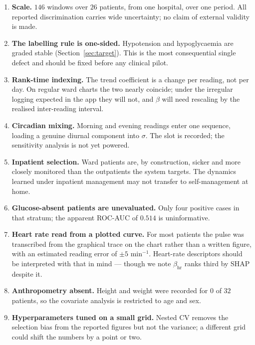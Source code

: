 \documentclass[11pt,a4paper]{article}
\newcommand{\hr}{\mathrm{hr}}
\begin{document}
\begin{enumerate}
\item \textbf{Scale.} $146$ windows over $26$ patients, from one hospital, over one
period. All reported discrimination carries wide uncertainty; no claim of external
validity is made.

\item \textbf{The labelling rule is one-sided.} Hypotension and hypoglycaemia are
graded \textsf{stable} (Section~\ref{sec:target}). This is the most consequential
single defect and should be fixed before any clinical pilot.

\item \textbf{Rank-time indexing.} The trend coefficient is a change per reading,
not per day. On regular ward charts the two nearly coincide; under the irregular
logging expected in the app they will not, and $\beta$ will need rescaling by the
realised inter-reading interval.

\item \textbf{Circadian mixing.} Morning and evening readings enter one sequence,
loading a genuine diurnal component into $\sigma$. The slot is recorded; the
sensitivity analysis is not yet powered.

\item \textbf{Inpatient selection.} Ward patients are, by construction, sicker and
more closely monitored than the outpatients the system targets. The dynamics
learned under inpatient management may not transfer to self-management at home.

\item \textbf{Glucose-absent patients are unevaluated.} Only four positive cases in
that stratum; the apparent ROC-AUC of $0.514$ is uninformative.

\item \textbf{Heart rate read from a plotted curve.} For most patients the pulse
was transcribed from the graphical trace on the chart rather than a written figure,
with an estimated reading error of $\pm 5$ min$^{-1}$. Heart-rate descriptors
should be interpreted with that in mind --- though we note $\beta_{\hr}$ ranks third
by SHAP despite it.

\item \textbf{Anthropometry absent.} Height and weight were recorded for $0$ of
$32$ patients, so the covariate analysis is restricted to age and sex.

\item \textbf{Hyperparameters tuned on a small grid.} Nested CV removes the
selection bias from the reported figures but not the variance; a different grid
could shift the numbers by a point or two.
\end{enumerate}
\end{document}
